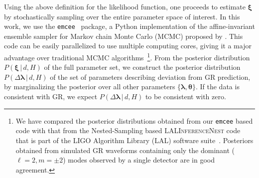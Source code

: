 \documentclass[prl,preprintnumbers,twocolumn,eqsecnum,floatfix,a4paper,nofootinbib,superscriptaddress]{revtex4}
\newcommand{\blambda}{\bm{\lambda}}
\newcommand{\btheta}{\bm{\theta}}
\newcommand{\bxi}{\bm{\xi}}
\begin{document}
Using the above definition for the likelihood function, one proceeds to estimate $\bxi$ by stochastically sampling over the entire parameter space of interest. In this work, we use the \texttt{emcee}~\cite{foreman2013emcee} package, a Python implementation of the affine-invariant ensemble sampler for Markov chain Monte Carlo (MCMC) proposed by \cite{goodman2010ensemble}. This code can be easily parallelized to use multiple computing cores, giving it a major advantage over traditional MCMC algorithms~\footnote{We have compared the posterior distributions obtained from our \texttt{emcee} based code with that from the Nested-Sampling based \textsc{LALInferenceNest} code~\cite{Veitch:2009hd} that is part of the LIGO Algorithm Library (LAL) software suite~\cite{LALsuite}. Posteriors obtained from simulated GR waveforms containing only the dominant ($\ell = 2, m = \pm 2$) modes observed by a single detector are in good agreement.}. From the posterior distribution $P(\bxi \, | \, d, H)$ of the full parameter set, we construct the posterior distribution $P(\Delta \blambda \, | \, d, H)$ of the set of parameters describing deviation from GR prediction, by marginalizing the posterior over all other parameters $\{\blambda, \btheta\}$. If the data is consistent with GR, we expect $P(\Delta \blambda \, | \, d, H)$ to be consistent with zero. 
\end{document}
